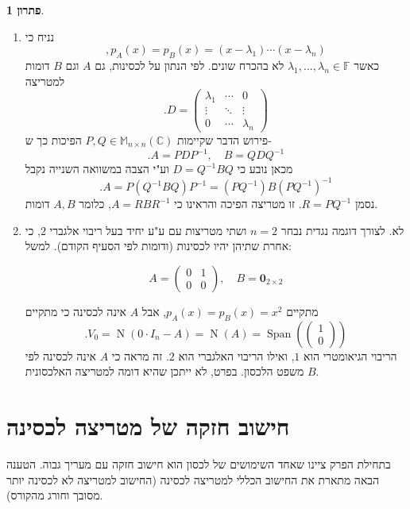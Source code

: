 \documentclass[12pt]{report}
\theoremstyle{plain}
\theoremstyle{definition}
\newtheorem*{solution}{פתרון}
\newcommand{\C}{\mathbb{C}}
\newcommand{\F}{\mathbb{F}}
\newcommand{\M}{\mathbb{M}}
\newcommand{\0}{\mathbf{0}}
\DeclareMathOperator{\Span}{Span}
\DeclareMathOperator{\Null}{N}
\begin{document}
\begin{solution}\
\begin{enumerate}[label=\alph*.]
\item 
נניח כי
$$
,p_A(x)=p_B(x)=(x-\lambda_1)\cdots(x-\lambda_n)
$$
כאשר 
$\lambda_1,...,\lambda_n\in\F$
לא בהכרח שונים. לפי הנתון על לכסינות, גם 
$A$
וגם
$B$
דומות למטריצה
$$
.D=\begin{pmatrix}
\lambda_1 & \cdots & 0 \\
\vdots & \ddots & \vdots \\
0 & \cdots & \lambda_n
\end{pmatrix}
$$
פירוש הדבר שקיימות
$P,Q\in\M_{n\times n}(\C)$
הפיכות כך ש-
$$
.A=PDP^{-1},\quad B=QDQ^{-1}
$$
מכאן נובע כי
$D=Q^{-1}BQ$
וע"י הצבה במשוואה השנייה נקבל
$$
.A=P(Q^{-1}BQ)P^{-1}=(PQ^{-1})B(PQ^{-1})^{-1}
$$
נסמן
$R=PQ^{-1}$.
זו מטריצה הפיכה והראינו כי
$A=RBR^{-1}$,
כלומר 
$A,B$
דומות.


\item 
לא. לצורך דוגמה נגדית נבחר
$n=2$
ושתי מטריצות עם ע"ע יחיד בעל ריבוי אלגברי 
$2$,
כי אחרת שתיהן יהיו לכסינות (ודומות לפי הסעיף הקודם). למשל:

$$
A=\begin{pmatrix}
0 & 1 \\
0 & 0
\end{pmatrix},\quad B=\0_{2\times 2}
$$

מתקיים
$p_A(x)=p_B(x)=x^2$,
אבל
$A$
אינה לכסינה כי מתקיים
$$
.V_0=\Null(0\cdot I_n-A)=\Null(A)=\Span\left(\begin{pmatrix}1\\0\end{pmatrix}\right)
$$
הריבוי הגיאומטרי הוא 
$1$,
ואילו הריבוי האלגברי הוא 
$2$.
זה מראה כי
$A$
אינה לכסינה לפי משפט הלכסון. בפרט, לא ייתכן שהיא דומה למטריצה האלכסונית 
$B$.


\end{enumerate}
\end{solution}

\section{חישוב חזקה של מטריצה לכסינה}

בתחילת הפרק ציינו שאחד השימושים של לכסון הוא חישוב חזקה עם מעריך גבוה. הטענה הבאה מתארת את החישוב הכללי למטריצה לכסינה (החישוב למטריצה לא לכסינה יותר מסובך וחורג מהקורס).
\end{document}
